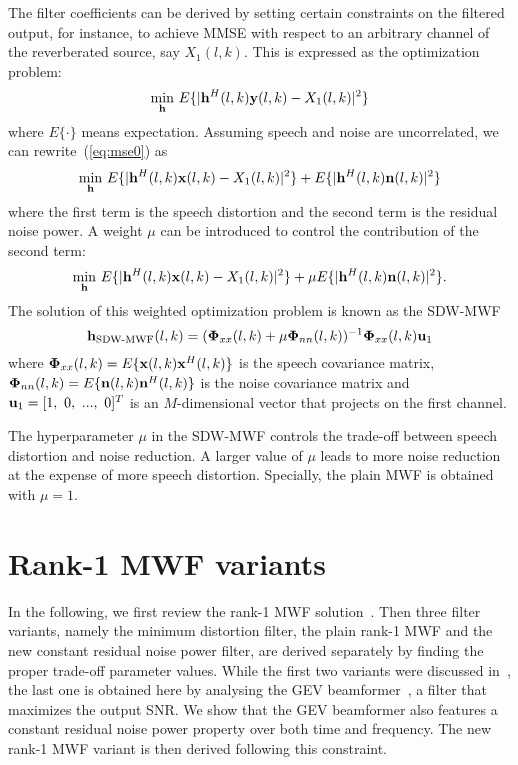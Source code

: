 \documentclass[review]{elsarticle}
\newif\ifproofread
\newcommand{\pfmarker}[1]{%
\ifproofread
\textcolor{red}{#1}%
\else
#1%
\fi
}
\begin{document}
The filter coefficients can be derived by setting certain constraints on the filtered output, for instance, to achieve MMSE with respect to an arbitrary channel of the reverberated source, say $X_1(l,k)$. This is expressed as the optimization problem:
\begin{equation}\label{eq:mse0}
  \underset{\bf h}{\min} ~ E\{|{\bf h}^H\pfmarker{(l,k)}{\bf y}\pfmarker{(l,k)} - X_1\pfmarker{(l,k)}|^2\}
\end{equation}
where $E\{ \cdot \}$ means expectation. Assuming speech and noise are uncorrelated, we can rewrite~(\ref{eq:mse0}) as
\begin{equation}\label{eq:mmse0}
  \underset{\bf h}{\min} ~ E\{|{\bf h}^H\pfmarker{(l,k)} {\bf x}\pfmarker{(l,k)} - X_1\pfmarker{(l,k)}|^2\} + E\{|{\bf h}^H\pfmarker{(l,k)}{\bf n}\pfmarker{(l,k)}|^2\}
\end{equation}
where the first term is the speech distortion and the second term is the residual noise power. A weight $\mu$ can be introduced to control the contribution of the second term:
\begin{equation}\label{eq:mmse}
  \underset{\bf h}{\min} ~ E\{|{\bf h}^H\pfmarker{(l,k)} {\bf x}\pfmarker{(l,k)} - X_1\pfmarker{(l,k)}|^2\} + \mu E\{|{\bf h}^H\pfmarker{(l,k)}{\bf n}\pfmarker{(l,k)}|^2\}.
\end{equation}
The solution of this weighted optimization problem is known as the SDW-MWF~\cite{2004sdwmwf}
\begin{equation}\label{eq:sdw-mwf}
{\bf h}_{\text{SDW-MWF}}\pfmarker{(l,k)}=({\bf \Phi}_{xx}\pfmarker{(l,k)}+\mu{\bf \Phi}_{nn}\pfmarker{(l,k)})^{-1}{\bf \Phi}_{xx}\pfmarker{(l,k)}{\bf u}_{1}
\end{equation}
where ${\bf \Phi}_{xx}(l,k)=E\{{\bf x}(l,k){\bf x}^H(l,k)\}$ is the speech covariance matrix, ${\bf \Phi}_{nn}(l,k)=E\{{\bf n}(l,k){\bf n}^H(l,k)\}$ is the noise covariance matrix and ${\bf u}_1=[1, ~0, ~...,~0]^T$ is an $M$-dimensional vector that projects on the first channel. \pfmarker{The hyperparameter $\mu$ in the SDW-MWF controls the trade-off between speech distortion and noise reduction. A larger value of $\mu$ leads to more noise reduction at the expense of more speech distortion. Specially, the plain MWF is obtained with $\mu=1$.}


\section{Rank-1 MWF variants}

\pfmarker{In the following, we first review the rank-1 MWF solution~\cite{2010r1MWF}. Then three filter variants, namely the minimum distortion filter, the plain rank-1 MWF and the new constant residual noise power filter, are derived separately by finding the proper trade-off parameter values. While the first two variants were discussed in~\cite{2010r1MWF}, the last one is obtained here by analysing the GEV beamformer~\cite{2007GEV}, a filter that maximizes the output SNR. We show that the GEV beamformer also features a constant residual noise power property over both time and frequency. The new rank-1 MWF variant is then derived following this constraint.}
\end{document}
